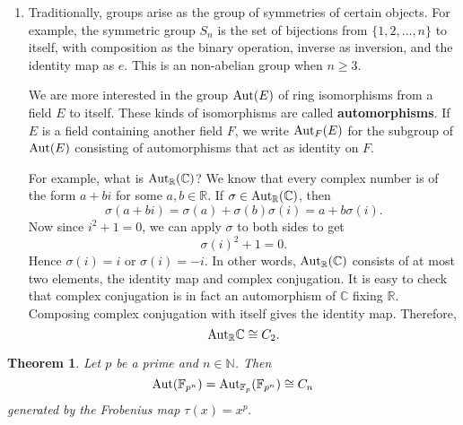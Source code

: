 \documentclass{article}
\def\Z{{\mathbb Z}}
\def\Aut{{\rm Aut}}
\def\R{{\mathbb R}}
\def\F{{\mathbb F}}
\def\N{{\mathbb N}}
\def\Z{{\mathbb Z}}
\def\F{{\mathbb F}}
\def\C{{\mathbb C}}
\newtheorem{theorem}[subsection]{Theorem}
\begin{document}
\begin{enumerate}
    We can define the quotient $G/H$ as the set of left cosets of $H$. To define a group structure on $G/H$ by $g_1H\cdot g_2H = (g_1g_2)H$, we need $H$ to be a \textbf{normal} subgroup: for any $g\in G$ and any $h\in H$, we have $ghg^{-1}\in H$. When $G$ is abelian, $ghg^{-1} = h$ and so every subgroup is normal. The set $S$ we saw in Lemma \ref{lem:mquot} is basically $(\Z/m\Z)^\times/\langle a\rangle.$

    Group homomorphisms are defined just like ring homomorphisms. Kernels of group homomorphisms are normal subgroups and we have the first isomorphism theorem for groups as well.

    \item Traditionally, groups arise as the group of symmetries of certain objects. For example, the symmetric group $S_n$ is the set of bijections from $\{1,2,\ldots,n\}$ to itself, with composition as the binary operation, inverse as inversion, and the identity map as $e$. This is an non-abelian group when $n\geq 3$.

    We are more interested in the group $\Aut(E)$ of ring isomorphisms from a field $E$ to itself. These kinds of isomorphisms are called \textbf{automorphisms}. If $E$ is a field containing another field $F$, we write $\Aut_F(E)$ for the subgroup of $\Aut(E)$ consisting of automorphisms that act as identity on $F$.

    For example, what is $\Aut_\R(\C)$? We know that every complex number is of the form $a + bi$ for some $a,b\in\R$. If $\sigma\in\Aut_\R(\C)$, then $$\sigma(a + bi) = \sigma(a) + \sigma(b)\sigma(i) = a + b\sigma(i).$$
    Now since $i^2 + 1 = 0$, we can apply $\sigma$ to both sides to get $$\sigma(i)^2 + 1 = 0.$$
    Hence $\sigma(i) = i$ or $\sigma(i) = -i$. In other words, $\Aut_\R(\C)$ consists of at most two elements, the identity map and complex conjugation. It is easy to check that complex conjugation is in fact an automorphism of $\C$ fixing $\R$. Composing complex conjugation with itself gives the identity map. Therefore, $$\Aut_\R\C\cong C_2.$$
\end{enumerate}
    

    \begin{theorem}
        Let $p$ be a prime and $n\in\N$. Then $$\Aut(\F_{p^n}) = \Aut_{\F_p}(\F_{p^n})\cong C_n$$
        generated by the Frobenius map $\tau(x) = x^p.$
    \end{theorem}
\end{document}
